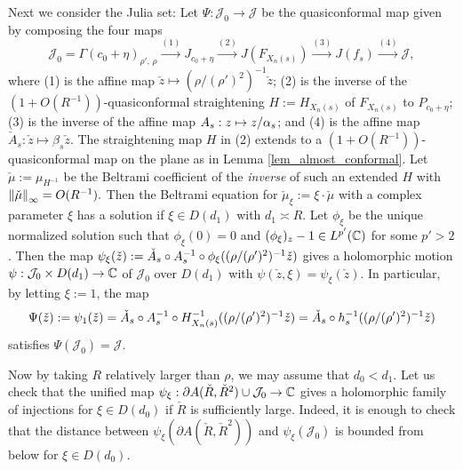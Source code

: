 Next we consider the Julia set:
Let $\Psi:\mathcal{J}_0 \to \mathcal{J}$ be the quasiconformal map
given by composing the four maps
$$
\mathcal{J}_0 
=\Gamma(c_0+\eta)_{\rho',\,\rho}
\stackrel{(1)}{\longrightarrow} 
J_{c_0+\eta} 
\stackrel{(2)}{\longrightarrow} 
J(F_{X_n(s)})
\stackrel{(3)}{\longrightarrow} 
J(f_s)
\stackrel{(4)}{\longrightarrow} 
\mathcal{J},
$$
where  (1) is the affine map $\check{z} \mapsto (\rho/(\rho')^2)^{-1} \check{z}$;
(2) is the inverse of the $(1+O(R^{-1}))$-quasiconformal 
straightening $H:=H_{X_n(s)}$ of $F_{X_n(s)}$ to $P_{c_0+\eta}$;  
(3) is the inverse of the affine map 
${A}_s: z \mapsto z/\alpha_s$;
and 
(4) 
is the affine map $\check{A}_s:\check{z} \mapsto \beta_s \check{z}$.
The straightening map $H$ in (2) 
extends to a $(1+O(R^{-1}))$-quasiconformal map 
on the plane as in Lemma \ref{lem_almost_conformal}.
Let $\check{\mu}:=\mu_{H^{-1}}$ be the Beltrami coefficient of the {\it inverse} of 
such an extended $H$ with ${\left\| \check{\mu} \right\|}_\infty=O(R^{-1}).$
Then the Beltrami equation for $\check{\mu}_\xi:=\xi \cdot \check{\mu}$ 
with a complex parameter $\xi$ 
has a solution if $\xi \in D(d_1)$ with $d_1 \asymp R$.
Let $\phi_\xi$ be the unique normalized solution 
such that $\phi_\xi(0)=0$ and $(\phi_\xi)_z-1 \in L^{p'}(\mathbb C)$ 
for some $p'>2$.
Then the map 
$\psi_\xi(\check{z})
:=\check{A}_s \circ A_s^{-1} \circ 
\phi_\xi ((\rho/(\rho')^2)^{-1} \check{z})$ 
gives a holomorphic motion
$\psi: \mathcal{J}_0 \times D(d_1) \to \mathbb C$
of $\mathcal{J}_0$ over $D(d_1)$ with $\psi(\check{z}, \xi)=\psi_\xi(\check{z})$.
In particular, by letting $\xi:=1$, the map 
\begin{equation}\label{eq_Psi}
\Psi(\check{z}):=\psi_1(\check{z})
=\check{A}_s \circ A_s^{-1} \circ 
H_{X_n(s)}^{-1} ((\rho/(\rho')^2)^{-1} \check{z})
=\check{A}_s \circ h_s^{-1} ((\rho/(\rho')^2)^{-1} \check{z})
\end{equation}
satisfies $\Psi(\mathcal{J}_0) = \mathcal{J}$.


Now by taking $R$ relatively larger than $\rho$,
 we may assume that $d_0 <d_1$.
Let us check that the unified map 
$\psi_\xi: \partial A(\check{R},\check{R}^2) \cup \mathcal{J}_0 \to \mathbb C$
gives a holomorphic family of injections for $\xi \in D(d_0)$
if $\check{R}$ is sufficiently large.
Indeed, it is enough to check that the distance between 
$\psi_\xi(\partial A(\check{R},\check{R}^2))$
and $\psi_\xi(\mathcal{J}_0)$ is bounded from below
for $\xi \in D(d_0)$.


